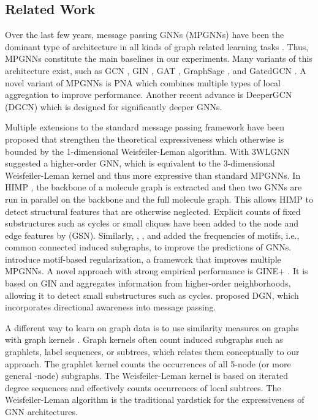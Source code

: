 \documentclass{scrartcl} \usepackage[dvipsnames]{xcolor}
\begin{document}
     \subsection{Related Work}
\label{relwork}





Over the last few years, message passing GNNs (MPGNNs) have been the dominant type of architecture in all kinds of graph related learning tasks \citep{wu2020comprehensive}.
Thus, MPGNNs constitute the main baselines in our experiments.
Many variants of this architecture exist, such as GCN \cite{kipf2017semi}, GIN \cite{Keyulu18}, GAT \cite{velivckovic2017graph}, GraphSage \cite{DBLP:journals/corr/HamiltonYL17}, and \mbox{GatedGCN} \cite{bresson2017residual}.
A novel variant of MPGNNs is PNA \cite{corso2020principal} which combines multiple types of local aggregation to improve performance.
Another recent advance is DeeperGCN (DGCN) \cite{li2020deepergcn} which is designed for significantly deeper GNNs.


Multiple extensions to the standard message passing framework have been proposed that strengthen the theoretical expressiveness which otherwise is bounded by the 1-dimensional Weisfeiler-Leman algorithm.
With 3WLGNN \citet{maron2019provably} suggested a higher-order GNN, which is equivalent to the 3-dimensional Weisfeiler-Leman kernel and thus more expressive than standard MPGNNs.
In HIMP \cite{fey2020hierarchical}, the backbone of a molecule graph is extracted and then two GNNs are run in parallel on the backbone and the full molecule graph.
This allows HIMP to detect structural features that are otherwise neglected.
Explicit counts of fixed substructures such as cycles or small cliques have been added to the node and edge features by \citet{bouritsas2020improving} (GSN).
Similarly, \citet{sankar2017motif}, \citet{lee2019graph}, and \citet{peng2020motif} added the frequencies of motifs, i.e., common connected induced subgraphs, to improve the predictions of GNNs.
\citet{sankar2020beyond} introduce motif-based regularization, a framework that improves multiple MPGNNs. A novel approach with strong empirical performance is GINE+ \cite{brossard2020graph}.
It is based on GIN and aggregates information from higher-order neighborhoods, allowing it to detect small substructures such as cycles. 
\citet{beaini2020directional} proposed DGN, which incorporates directional awareness into message passing.

A different way to learn on graph data is to use similarity measures on graphs with graph kernels \cite{kriege2020survey}.
Graph kernels often count induced subgraphs such as graphlets, label sequences, or subtrees, which relates them conceptually to our approach.
The graphlet kernel \cite{shevispet+09} counts the occurrences of all 5-node (or more general -node) subgraphs. The Weisfeiler-Leman kernel \cite{shervashidze2011weisfeiler} is based on iterated degree sequences and effectively counts occurrences of local subtrees.
The Weisfeiler-Leman algorithm is the traditional yardstick for the expressiveness of GNN architectures.
\end{document}
